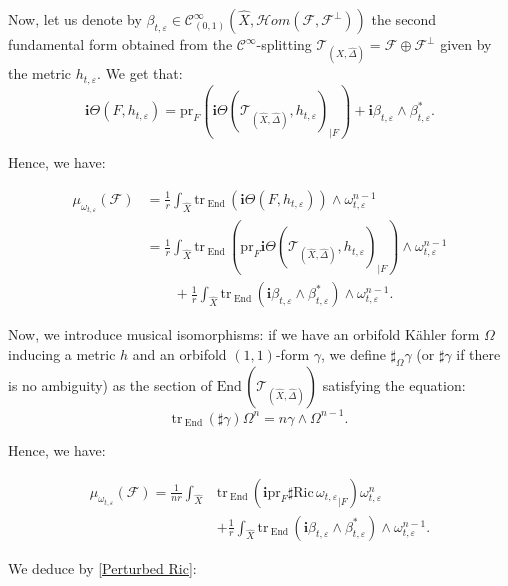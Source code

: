 \documentclass[12pt,a4paper]{amsart}
\newcommand{\End}{\mathrm{End}\,}
\newcommand{\Ric}{\mathrm{Ric}\,}
\newcommand{\tr}{\mathrm{tr}\,}
\theoremstyle{plain}
\theoremstyle{definition}
\begin{document}
Now, let us denote by $\beta_{t, \varepsilon} \in \mathcal{C}^\infty_{(0,1)}(\widehat{X}, \mathcal{H}om(\mathcal{F}, \mathcal{F}^\perp))$ the second fundamental form obtained from the $\mathcal{C}^\infty$-splitting $\mathcal{T}_{(\widehat{X}, \widehat{\Delta})} = \mathcal{F} \oplus \mathcal{F}^\perp$ given by the metric $h_{t, \varepsilon}$. We get that:
$$
\textbf{i}\Theta (F, h_{t,\varepsilon}) =  \mathrm{pr}_F \left(\textbf{i}\Theta(\mathcal{T}_{(\widehat{X}, \widehat{\Delta})}, h_{t, \varepsilon})_{|F} \right) + \textbf{i}\beta_{t, \varepsilon} \wedge \beta_{t, \varepsilon}^*.
$$

Hence, we have:

\begin{align*}
    \mu_{\omega_{t, \varepsilon}}(\mathcal{F}) 
    & = \frac{1}{r} \int_{\widehat{X}} \tr_\End \left( \textbf{i}\Theta(F, h_{t,\varepsilon}) \right) \wedge \omega_{t, \varepsilon}^{n-1} \\
    & = \frac{1}{r} \int_{\widehat{X}} \tr_\End \left(  \mathrm{pr}_F \textbf{i}\Theta(\mathcal{T}_{(\widehat{X}, \widehat{\Delta})}, h_{t, \varepsilon})_{|F} \right) \wedge \omega_{t, \varepsilon}^{n-1} \\
    & \qquad + \frac{1}{r} \int_{\widehat{X}} \tr_\End \left(\textbf{i} \beta_{t, \varepsilon} \wedge \beta_{t, \varepsilon}^* \right) \wedge \omega_{t, \varepsilon}^{n-1}.
\end{align*}

Now, we introduce musical isomorphisms: if we have an orbifold K\"ahler form $\Omega$ inducing a metric $h$ and an orbifold $(1,1)$-form $\gamma$, we define $\sharp_\Omega \gamma$ (or $\sharp \gamma$ if there is no ambiguity) as the section of $\End(\mathcal{T}_{(\widehat{X}, \widehat{\Delta})})$ satisfying the equation:
$$
\tr_\End (\sharp \gamma) \Omega^n = n \gamma \wedge \Omega^{n-1}.
$$

Hence, we have:

\begin{align*}
    \mu_{\omega_{t, \varepsilon}}(\mathcal{F}) = \frac{1}{nr} \int_{\widehat{X}} & \tr_\End \left( \textbf{i} \mathrm{pr}_F \sharp \Ric {\omega_{t, \varepsilon}}_{|F} \right) \omega_{t, \varepsilon}^n \\
    & + \frac{1}{r} \int_{\widehat{X}} \tr_\End \left(\textbf{i}\beta_{t, \varepsilon} \wedge \beta_{t, \varepsilon}^* \right) \wedge \omega_{t, \varepsilon}^{n-1}.
\end{align*}

We deduce by \eqref{Perturbed Ric}:
\end{document}
